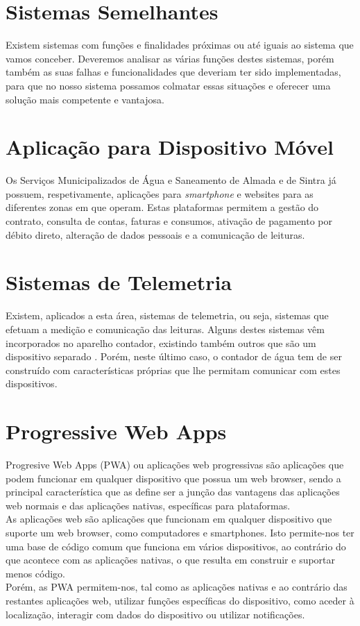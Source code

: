 \section{Sistemas Semelhantes} \label{sec:semelhantes}
Existem sistemas com funções e finalidades próximas ou até iguais ao sistema que vamos conceber. Deveremos analisar as várias funções destes sistemas, porém também as suas falhas e funcionalidades que deveriam ter sido implementadas, para que no nosso sistema possamos colmatar essas situações e oferecer uma solução mais competente e vantajosa.

\section*{Aplicação para Dispositivo Móvel} \label{par:appsmas}
Os Serviços Municipalizados de Água e Saneamento de Almada e de Sintra já possuem, respetivamente, aplicações para \textit{smartphone} \cite{smas:almada} e websites \cite{smas:sintra} para as diferentes zonas em que operam. Estas plataformas permitem a gestão do contrato, consulta de contas, faturas e consumos, ativação de pagamento por débito direto, alteração de dados pessoais e a comunicação de leituras.

\section*{Sistemas de Telemetria} \label{par:telemetria}
Existem, aplicados a esta área, sistemas de telemetria, ou seja, sistemas que efetuam a medição e comunicação das leituras. Alguns destes sistemas vêm incorporados no aparelho contador, existindo também outros que são um dispositivo separado \cite{janz:impji}. Porém, neste último caso, o contador de água tem de ser construído com características próprias que lhe permitam comunicar com estes dispositivos.

\section{Progressive Web Apps} \label{sec:pwa}
Progresive Web Apps (PWA) ou aplicações web progressivas são aplicações que podem funcionar em qualquer dispositivo que possua um web browser, sendo a principal característica que as define ser a junção das vantagens das aplicações web normais e das aplicações nativas, específicas para plataformas. \\
As aplicações web são aplicações que funcionam em qualquer dispositivo que suporte um web browser, como computadores e smartphones. Isto permite-nos ter uma base de código comum que funciona em vários dispositivos, ao contrário do que acontece com as aplicações nativas, o que resulta em construir e suportar menos código. \\
Porém, as PWA permitem-nos, tal como as aplicações nativas e ao contrário das restantes aplicações web, utilizar funções específicas do dispositivo, como aceder à localização, interagir com dados do dispositivo ou utilizar notificações. 

